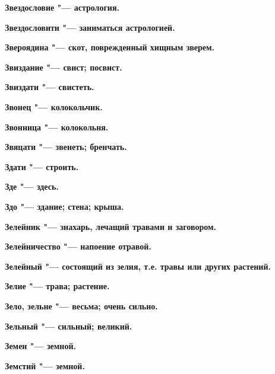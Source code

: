 \bfseries Звездословие \normalfont{} "--- астрология. 




\bfseries Звездословити \normalfont{} "--- заниматься астрологией. 




\bfseries Звероядина \normalfont{} "--- скот, поврежденный хищным зверем. 




\bfseries Звиздание \normalfont{} "--- свист; посвист. 




\bfseries Звиздати \normalfont{} "--- свистеть. 




\bfseries Звонец \normalfont{} "--- колокольчик. 




\bfseries Звонница \normalfont{} "--- колокольня. 




\bfseries Звяцати \normalfont{} "--- звенеть; бренчать. 




\bfseries Здати \normalfont{} "--- строить. 




\bfseries Зде \normalfont{} "--- здесь. 




\bfseries Здо \normalfont{} "--- здание; стена; крыша. 




\bfseries Зелейник \normalfont{} "--- знахарь, лечащий травами и заговором. 




\bfseries Зелейничество \normalfont{} "--- напоение отравой. 




\bfseries Зелейный \normalfont{} "--- состоящий из зелия, т.е. травы или других растений. 




\bfseries Зелие \normalfont{} "--- трава; растение. 




\bfseries Зело, зельне \normalfont{} "--- весьма; очень сильно. 




\bfseries Зельный \normalfont{} "--- сильный; великий. 




\bfseries Земен \normalfont{} "--- земной. 




\bfseries Земстий \normalfont{} "--- земной. 




